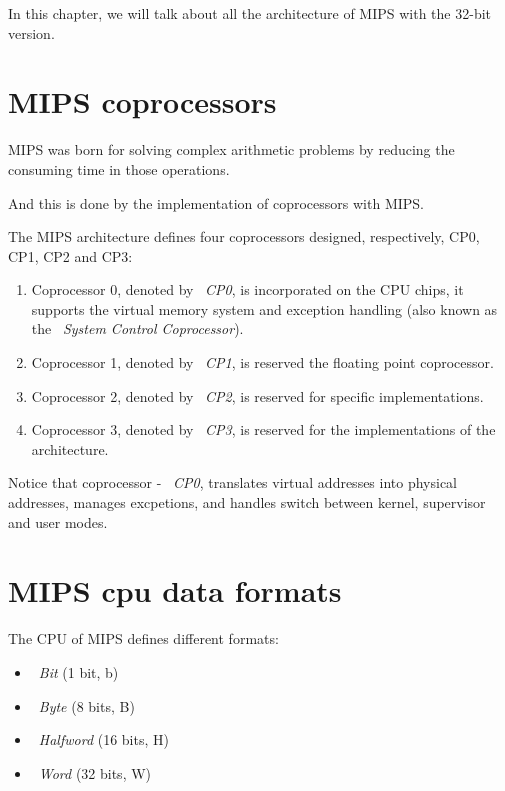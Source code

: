 \documentclass[
  oneside,
  11pt, a4paper,
  footinclude=true,
  headinclude=true,
  cleardoublepage=empty
]{scrbook}
\begin{document}

\newpage

In this chapter, we will talk about all the architecture of MIPS with the 32-bit version.

\section{MIPS coprocessors}

MIPS was born for solving complex arithmetic problems by reducing the consuming time in those operations.

And this is done by the implementation of coprocessors with MIPS.

The MIPS architecture defines four coprocessors designed, respectively, CP0, CP1, CP2 and CP3:

\begin{enumerate}
\item Coprocessor 0, denoted by ~\textit{CP0}, is incorporated on the CPU chips, it supports the virtual memory system and exception handling (also known as the ~\textit{System Control Coprocessor}).
\item Coprocessor 1, denoted by ~\textit{CP1}, is reserved the floating point coprocessor.
\item Coprocessor 2, denoted by ~\textit{CP2}, is reserved for specific implementations.
\item Coprocessor 3, denoted by ~\textit{CP3}, is reserved for the implementations of the architecture.
\end{enumerate}

Notice that coprocessor - ~\textit{CP0}, translates virtual addresses into physical addresses, manages excpetions, and handles switch between kernel, supervisor and user modes.

\section{MIPS cpu data formats}

The CPU of MIPS defines different formats:
\begin{itemize}
\item ~\textit{Bit} (1 bit, b)
\item ~\textit{Byte} (8 bits, B)
\item ~\textit{Halfword} (16 bits, H)
\item ~\textit{Word} (32 bits, W)
\end{itemize}
\end{document}
